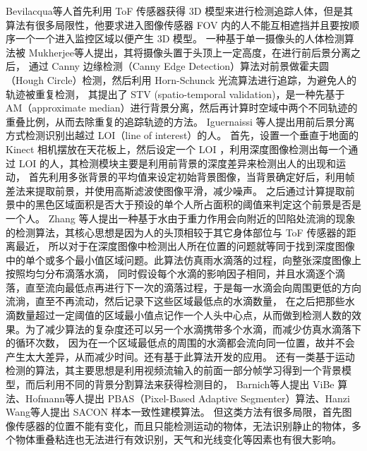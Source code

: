 Bevilacqua等人\cite{10}首先利用 ToF 传感器获得 3D 模型来进行检测追踪人体，但是其算法有很多局限性，他要求进入图像传感器 FOV 内的人不能互相遮挡并且要按顺序一个一个进入监控区域以便产生 3D 模型。
一种基于单一摄像头的人体检测算法被 Mukherjee等人\cite{11}提出，其将摄像头置于头顶上一定高度，在进行前后景分离之后，
通过 Canny 边缘检测（Canny Edge Detection）算法对前景做霍夫圆（Hough Circle）检测，然后利用 Horn-Schunck 光流算法进行追踪，为避免人的轨迹被重复检测，
其提出了 STV (spatio-temporal validation)，是一种先基于 AM（approximate median）进行背景分离，然后再计算时空域中两个不同轨迹的重叠比例，从而去除重复的追踪轨迹的方法。
Iguernaissi 等人\cite{12}提出用前后景分离方式检测识别出越过 LOI（line of interest）的人。
首先，设置一个垂直于地面的 Kinect 相机摆放在天花板上，然后设定一个 LOI ，利用深度图像检测出每一个通过 LOI 的人，其检测模块主要是利用前背景的深度差异来检测出人的出现和运动，
首先利用多张背景的平均值来设定初始背景图像，当背景确定好后，利用帧差法来提取前景，并使用高斯滤波使图像平滑，减少噪声。
之后通过计算提取前景中的黑色区域面积是否大于预设的单个人所占面积的阈值来判定这个前景是否是一个人。
Zhang 等人\cite{13}提出一种基于水由于重力作用会向附近的凹陷处流淌的现象的检测算法，其核心思想是因为人的头顶相较于其它身体部位与 ToF 传感器的距离最近，
所以对于在深度图像中检测出人所在位置的问题就等同于找到深度图像中的单个或多个最小值区域问题。此算法仿真雨水滴落的过程，向整张深度图像上按照均匀分布滴落水滴，
同时假设每个水滴的影响因子相同，并且水滴逐个滴落，直至流向最低点再进行下一次的滴落过程，于是每一水滴会向周围更低的方向流淌，直至不再流动，然后记录下这些区域最低点的水滴数量，
在之后把那些水滴数量超过一定阈值的区域最小值点记作一个人头中心点，从而做到检测人数的效果。为了减少算法的复杂度还可以另一个水滴携带多个水滴，而减少仿真水滴落下的循环次数，
因为在一个区域最低点的周围的水滴都会流向同一位置，故并不会产生太大差异，从而减少时间。还有基于此算法开发的应用\cite{14}。
还有一类基于运动检测的算法，其主要思想是利用视频流输入的前面一部分帧学习得到一个背景模型，而后利用不同的背景分割算法来获得检测目的，
Barnich等人提出 ViBe 算法\cite{15}、Hofmann等人提出 PBAS（Pixel-Based Adaptive Segmenter）算法\cite{16}、Hanzi Wang等人提出 SACON 样本一致性建模算法\cite{17}。
但这类方法有很多局限，首先图像传感器的位置不能有变化，而且只能检测运动的物体，无法识别静止的物体，多个物体重叠粘连也无法进行有效识别，天气和光线变化等因素也有很大影响。

